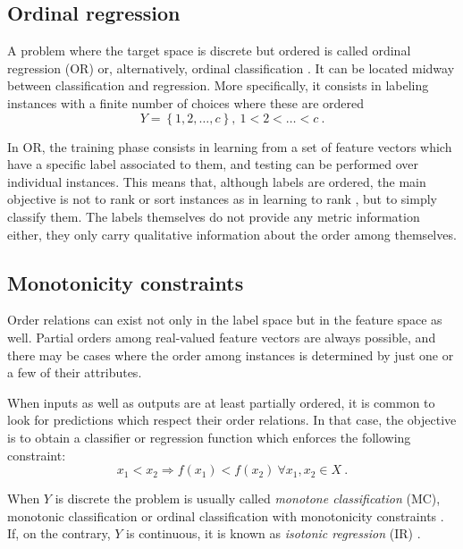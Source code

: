 \subsection{Ordinal regression}

A problem where the target space is discrete but ordered is called ordinal regression (OR) or, alternatively, ordinal classification \cite{ord-survey}. It can be located midway between classification and regression. More specifically, it consists in labeling instances with a finite number of choices where these are ordered
\begin{equation}
Y=\left\{1,2,\dots,c\right\},~1<2<\dots<c~.
\end{equation}

In OR, the training phase consists in learning from a set of feature vectors which have a specific label associated to them, and testing can be performed over individual instances. This means that, although labels are ordered, the main objective is not to rank or sort instances as in learning to rank \cite{ltr}, but to simply classify them. The labels themselves do not provide any metric information either, they only carry qualitative information about the order among themselves.

\subsection{Monotonicity constraints}

Order relations can exist not only in the label space but in the feature space as well. Partial orders among real-valued feature vectors are always possible, and there may be cases where the order among instances is determined by just one or a few of their attributes.

When inputs as well as outputs are at least partially ordered, it is common to look for predictions which respect their order relations. In that case, the objective is to obtain a classifier or regression function which enforces the following constraint:
\begin{equation}
x_1<x_2\Rightarrow f(x_1)<f(x_2)~\forall x_1,x_2\in X~.
\end{equation}

When $Y$ is discrete the problem is usually called \emph{monotone classification} (MC), monotonic classification or ordinal classification with monotonicity constraints \cite{mc-salva}. If, on the contrary, $Y$ is continuous, it is known as \emph{isotonic regression} (IR) \cite{ir-book}.


